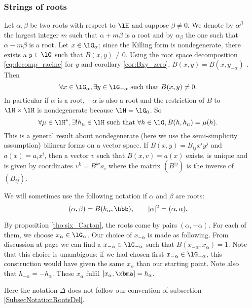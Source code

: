 \subsubsection{Strings of roots}


Let $\alpha,\beta$ be two roots with respect to $\lH$ and suppose $\beta\neq 0$. We denote by $\alpha^{\beta}$ the largest integer $m$ such that $\alpha+m\beta$ is a root and by $\alpha_{\beta}$ the one such that $\alpha-m\beta$ is a root. Let $x\in\lG_{\alpha}$; since the Killing form is nondegenerate, there exists a $y\in\lG$ such that $B(x,y)\neq 0$. Using the root space decomposition \eqref{eq:decomp_racine} for $y$ and corollary \ref{cor:Bxy_zero}, $B(x,y)=B(x,y_{-\alpha})$ . Then \label{pg:root_ss}
\[
\forall x\in\lG_{\alpha},\exists y\in\lG_{-\alpha}\textrm{ such that } B(x,y)\neq 0.
\]
In particular if $\alpha$ is a root, $-\alpha$ is also a root and the restriction of $B$ to $\lH\times\lH$ is nondegenerate because $\lH=\lG_0$. So
\[
\forall\mu\in\lH^*,\exists!h_{\mu}\in\lH\textrm{ such that } \forall h\in\lG, B(h,h_{\mu})=\mu(h).
\]
This is a general result about nondegenerate (here we use the semi-simplicity assumption) bilinear forms on a vector space. If $B(x,y)=B_{ij}x^iy^j$ and $a(x)=a_ix^i$, then a vector $v$ such that $B(x,v)=a(x)$ exists, is unique and is given by coordinates $v^k=B^{ki}a_i$ where the matrix $(B^{ij})$ is the inverse of $(B_{ij})$.

We will sometimes use the following notation if $\alpha$ and $\beta$ are roots:
\[
(\alpha,\beta)=B( h_{\alpha},\hbb),\qquad |\alpha|^2=(\alpha,\alpha).
\]

By proposition \ref{tho:six_Cartan}, the roots come by pairs $(\alpha,-\alpha)$. For each of them, we choose $x_{\alpha}\in\lG_{\alpha}$. Our choice of $x_{-\alpha}$ is made as following. From discussion at page \pageref{pg:root_ss} we can find a $x_{-\alpha}\in\lG_{-\alpha}$ such that $B(x_{-\alpha},x_{\alpha})=1$. Note that this choice is unambigous: if we had chosen first $x_{-\alpha}\in\lG_{-\alpha}$, this construction would have given the same $x_{\alpha}$ than our starting point. Note also that $h_{-\alpha}=-h_{\alpha}$. These $ x_{\alpha}$ fulfil $[ x_{\alpha},\xbma]= h_{\alpha}$.

\begin{probleme}
    Here the notation \( \Delta\) does not follow our convention of subsection \ref{SubsecNotationRootsDel}.
\end{probleme}

